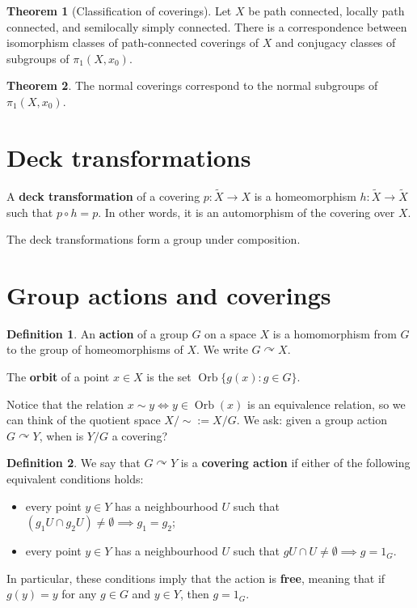 \documentclass{book}
\theoremstyle{definition}
\newtheorem*{defn}{Definition}
\newtheorem*{teo}{Theorem}
\DeclareMathOperator{\Orb}{Orb}
\begin{document}
\begin{teo}[Classification of coverings]
Let $X$ be path connected, locally path connected, and
semilocally simply connected. There is a correspondence
between isomorphism classes of path-connected coverings of
$X$ and conjugacy classes of subgroups of $\pi_1(X,x_0)$.
\end{teo}

\begin{teo}
The normal coverings correspond to the normal subgroups of
$\pi_1(X,x_0)$.
\end{teo}

\section{Deck transformations}

A \textbf{deck transformation} of a covering $p:\tilde X\to X$
is a homeomorphism $h:\tilde X\to\tilde X$ such that
$p\circ h=p$. In other words, it is an automorphism of the
covering over $X$.

The deck transformations form a group under composition.

\section{Group actions and coverings}\label{sec:acciones}

\begin{defn}
An \textbf{action} of a group $G$ on a space $X$ is a
homomorphism from $G$ to the group of homeomorphisms of $X$.
We write $G\curvearrowright X$.

The \textbf{orbit} of a point $x\in X$ is the set
$\Orb\{g(x):g\in G\}$.
\end{defn}

Notice that the relation $x\sim{}y\iff y\in\Orb(x)$ is an
equivalence relation, so we can think of the quotient space
$X/\sim{}:=X/G$. We ask: given a group action
$G\curvearrowright Y$, when is $Y/G$ a covering?

\begin{defn}
We say that $G\curvearrowright Y$ is a \textbf{covering
action} if either of the following equivalent conditions
holds:
\begin{itemize}
\item every point $y\in Y$ has a neighbourhood $U$ such that
$(g_1U\cap g_2U)\neq\emptyset\implies g_1=g_2$;
\item every point $y\in Y$ has a neighbourhood $U$ such that
$gU\cap U\neq\emptyset\implies g=1_G$.
\end{itemize}
In particular, these conditions imply that the action is
\textbf{free}, meaning that if $g(y)=y$ for any $g\in G$ and
$y\in Y$, then $g=1_G$.
\end{defn}
\end{document}
